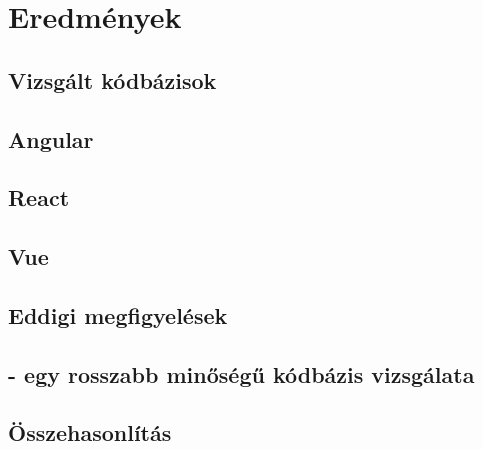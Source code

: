 \chapter{Eredmények}
\label{ch:results}

\section{Vizsgált kódbázisok}

\section{Angular}

\section{React}

\section{Vue}

\section{Eddigi megfigyelések}

\section{ - egy rosszabb minőségű kódbázis vizsgálata}

\section{Összehasonlítás}
